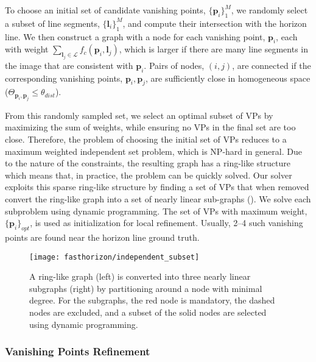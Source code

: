 To choose an initial set of candidate vanishing points,
$\{\mathbf{p}_i\}_1^M$, we randomly select a subset of line segments,
$\{\mathbf{l}_i\}_1^M$, and compute their intersection with the horizon
line.  We then construct a graph with a node for each vanishing point,
$\mathbf{p}_i$, each with weight $\sum_{\mathbf{l}_j \in \mathcal{L}}f_c(\mathbf{p}_i,
\mathbf{l}_j)$, which is larger if there are many line segments in the image
that are consistent with $\mathbf{p}_i$. Pairs of nodes, $(i,j)$, are
connected if the corresponding vanishing points, $\mathbf{p}_i, \mathbf{p}_j$, are
sufficiently close in homogeneous space ($\Theta_{\mathbf{p}_i,\mathbf{p}_j} \le
\theta_{dist}$).

From this randomly sampled set, we select an optimal subset of VPs by
maximizing the sum of weights, while ensuring no VPs in the final set
are too close.  Therefore, the problem of choosing the initial set of
VPs reduces to a maximum weighted independent set problem, which is
NP-hard in general. Due to the nature of the constraints, the
resulting graph has a ring-like structure which means that, in
practice, the problem can be quickly solved. Our solver exploits this
sparse ring-like structure by finding a set of VPs that when removed
convert the ring-like graph into a set of nearly linear sub-graphs
(). We solve each subproblem using dynamic
programming. The set of VPs with maximum weight, $\{\mathbf{p}_i\}_{opt}$,
is used as initialization for local refinement. Usually, 2--4 such
vanishing points are found near the horizon line ground truth.

\begin{figure}
  \centering
  \texttt{[image: fasthorizon/independent\_subset]}

  \caption{A ring-like graph (left) is converted into three nearly
    linear subgraphs (right) by partitioning around a node with
    minimal degree. For the subgraphs, the red node is mandatory, the
    dashed nodes are excluded, and a subset of the solid nodes are
    selected using dynamic programming.}

  \label{fig:subset}
\end{figure}

\subsubsection{Vanishing Points Refinement}
\label{sec:refinement}

